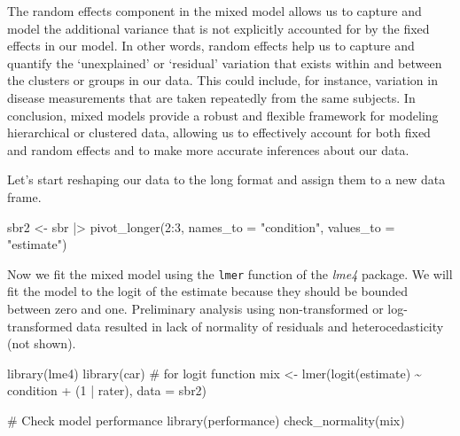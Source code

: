 \documentclass[
  letterpaper,
  DIV=11,
  numbers=noendperiod]{scrreprt}
\newenvironment{Shaded}{\begin{snugshade}}{\end{snugshade}}
\newcommand{\AttributeTok}[1]{\textcolor[rgb]{0.40,0.45,0.13}{#1}}
\newcommand{\CommentTok}[1]{\textcolor[rgb]{0.37,0.37,0.37}{#1}}
\newcommand{\DecValTok}[1]{\textcolor[rgb]{0.68,0.00,0.00}{#1}}
\newcommand{\FunctionTok}[1]{\textcolor[rgb]{0.28,0.35,0.67}{#1}}
\newcommand{\NormalTok}[1]{\textcolor[rgb]{0.00,0.23,0.31}{#1}}
\newcommand{\OtherTok}[1]{\textcolor[rgb]{0.00,0.23,0.31}{#1}}
\newcommand{\SpecialCharTok}[1]{\textcolor[rgb]{0.37,0.37,0.37}{#1}}
\newcommand{\StringTok}[1]{\textcolor[rgb]{0.13,0.47,0.30}{#1}}
\begin{document}
The random effects component in the mixed model allows us to capture and
model the additional variance that is not explicitly accounted for by
the fixed effects in our model. In other words, random effects help us
to capture and quantify the `unexplained' or `residual' variation that
exists within and between the clusters or groups in our data. This could
include, for instance, variation in disease measurements that are taken
repeatedly from the same subjects. In conclusion, mixed models provide a
robust and flexible framework for modeling hierarchical or clustered
data, allowing us to effectively account for both fixed and random
effects and to make more accurate inferences about our data.

Let's start reshaping our data to the long format and assign them to a
new data frame.

\begin{Shaded}
\begin{Highlighting}[]
\NormalTok{sbr2 }\OtherTok{\textless{}{-}}\NormalTok{ sbr }\SpecialCharTok{|\textgreater{}} 
  \FunctionTok{pivot\_longer}\NormalTok{(}\DecValTok{2}\SpecialCharTok{:}\DecValTok{3}\NormalTok{, }\AttributeTok{names\_to =} \StringTok{"condition"}\NormalTok{, }\AttributeTok{values\_to =} \StringTok{"estimate"}\NormalTok{)}
\end{Highlighting}
\end{Shaded}

Now we fit the mixed model using the \texttt{lmer} function of the
\emph{lme4} package. We will fit the model to the logit of the estimate
because they should be bounded between zero and one. Preliminary
analysis using non-transformed or log-transformed data resulted in lack
of normality of residuals and heterocedasticity (not shown).

\begin{Shaded}
\begin{Highlighting}[]
\FunctionTok{library}\NormalTok{(lme4) }
\FunctionTok{library}\NormalTok{(car) }\CommentTok{\# for logit function}
\NormalTok{mix }\OtherTok{\textless{}{-}} \FunctionTok{lmer}\NormalTok{(}\FunctionTok{logit}\NormalTok{(estimate) }\SpecialCharTok{\textasciitilde{}}\NormalTok{ condition }\SpecialCharTok{+}\NormalTok{ (}\DecValTok{1} \SpecialCharTok{|}\NormalTok{ rater), }\AttributeTok{data =}\NormalTok{ sbr2)}

\CommentTok{\# Check model performance}
\FunctionTok{library}\NormalTok{(performance)}
\FunctionTok{check\_normality}\NormalTok{(mix)}
\end{Highlighting}
\end{Shaded}
\end{document}
